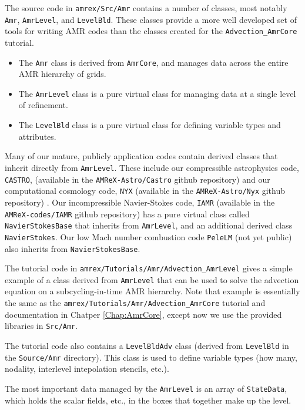 The source code in {\tt amrex/Src/Amr} contains a number of classes, most notably
{\tt Amr}, {\tt AmrLevel}, and {\tt LevelBld}.
These classes provide a more well developed set of tools for writing AMR codes
than the classes created for the {\tt Advection\_AmrCore} tutorial.
\begin{itemize}
\item The {\tt Amr} class is derived from {\tt AmrCore}, and manages data across the 
entire AMR hierarchy of grids.
\item The {\tt AmrLevel} class is a pure virtual class for managing data at a
single level of refinement.
\item The {\tt LevelBld} class is a pure virtual class for defining variable types
and attributes.
\end{itemize}

Many of our mature, publicly application codes contain derived classes that inherit directly
from {\tt AmrLevel}.  These include our compressible astrophysics code,
{\tt CASTRO},
(available in the {\tt AMReX-Astro/Castro} github repository) 
 and our computational cosmology code, {\tt NYX}
(available in the {\tt AMReX-Astro/Nyx} github repository)   .
Our incompressible Navier-Stokes code, {\tt IAMR}
(available in the {\tt AMReX-codes/IAMR} github repository)
has a pure virtual class called {\tt NavierStokesBase} that inherits from {\tt AmrLevel},
and an additional derived class {\tt NavierStokes}.
Our low Mach number combustion code {\tt PeleLM} (not yet public) also inherits
from {\tt NavierStokesBase}.

The tutorial code in {\tt amrex/Tutorials/Amr/Advection\_AmrLevel} gives a simple
example of a class derived from {\tt AmrLevel} that can be used to solve
the advection equation on a subcycling-in-time AMR hierarchy.  Note that example
is essentially the same as the {\tt amrex/Tutorials/Amr/Advection\_AmrCore} tutorial
and documentation in Chatper \ref{Chap:AmrCore}, except now we use the provided
libraries in {\tt Src/Amr}.

The tutorial code also contains a {\tt LevelBldAdv} class (derived from {\tt LevelBld} in the
{\tt Source/Amr} directory).  This class is used to define variable types (how many, nodality,
interlevel intepolation stencils, etc.).

The most important data managed by the {\tt AmrLevel} is an array of {\tt StateData},
which holds the scalar fields, etc., in the boxes that together make up the level.

